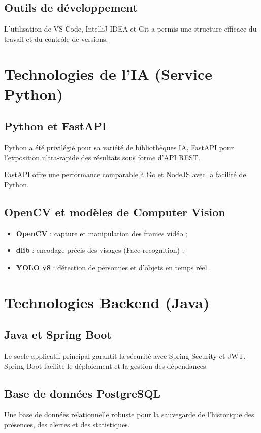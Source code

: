 \documentclass[12pt,a4paper]{report}
\numberwithin{figure}{chapter}
\numberwithin{table}{chapter}
\begin{document}
\subsection{Outils de développement}
L'utilisation de VS Code, IntelliJ IDEA et Git a permis une structure efficace du travail et du
contrôle de versions.

\section{Technologies de l'IA (Service Python)}

\subsection{Python et FastAPI}
Python a été privilégié pour sa variété de bibliothèques IA, FastAPI pour l'exposition ultra-rapide
des résultats sous forme d'API REST.

\begin{infobox}
  FastAPI offre une performance comparable à Go et NodeJS avec la facilité de Python.
\end{infobox}

\subsection{OpenCV et modèles de Computer Vision}
\begin{itemize}
  \item \textbf{OpenCV} : capture et manipulation des frames vidéo ;
  \item \textbf{dlib} : encodage précis des visages (Face recognition) ;
  \item \textbf{YOLO v8} : détection de personnes et d'objets en temps réel.
\end{itemize}

\section{Technologies Backend (Java)}

\subsection{Java et Spring Boot}
Le socle applicatif principal garantit la sécurité avec Spring Security et JWT. Spring Boot
facilite le déploiement et la gestion des dépendances.

\subsection{Base de données PostgreSQL}
Une base de données relationnelle robuste pour la sauvegarde de l'historique des présences,
des alertes et des statistiques.
\end{document}
